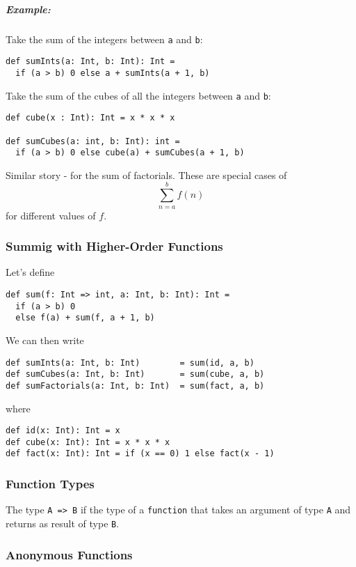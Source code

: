 \documentclass{scrartcl}
\newcommand{\example}{\subparagraph{Example:}} %
\newcommand{\term}[1]{\verb~#1~} %
\begin{document}
\example Take the sum of the integers between \lstinline|a| and \lstinline|b|:
\begin{lstlisting}
def sumInts(a: Int, b: Int): Int = 
  if (a > b) 0 else a + sumInts(a + 1, b)
\end{lstlisting}

Take the sum of the cubes of all the integers between \lstinline|a| and
\lstinline|b|:

\begin{lstlisting}
def cube(x : Int): Int = x * x * x

def sumCubes(a: int, b: Int): int =
  if (a > b) 0 else cube(a) + sumCubes(a + 1, b)
\end{lstlisting}

Similar story - for the sum of factorials. These are special cases of
$$\sum_{n=a}^b f(n)$$
for different values of $f$.

\subsubsection{Summig with Higher-Order Functions}
\label{sec:SummingWHighOderFunctions}

Let's define
\begin{lstlisting}
def sum(f: Int => int, a: Int, b: Int): Int = 
  if (a > b) 0
  else f(a) + sum(f, a + 1, b)
\end{lstlisting}

We can then write
\begin{lstlisting}
def sumInts(a: Int, b: Int)        = sum(id, a, b)
def sumCubes(a: Int, b: Int)       = sum(cube, a, b)
def sumFactorials(a: Int, b: Int)  = sum(fact, a, b)
\end{lstlisting}

where
\begin{lstlisting}
def id(x: Int): Int = x
def cube(x: Int): Int = x * x * x
def fact(x: Int): Int = if (x == 0) 1 else fact(x - 1)
\end{lstlisting}

\subsubsection{Function Types}
\label{sec:FuncTypes}

The type \lstinline|A => B| if the type of a \term{function} that takes an
argument of type \lstinline|A| and returns as result of type \lstinline|B|.

\subsubsection{Anonymous Functions}
\label{sec:AnonymousFuncitons}
\end{document}
